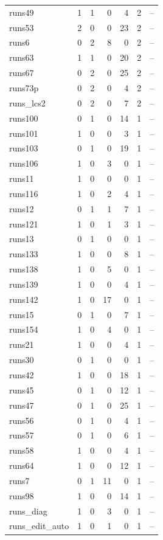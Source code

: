 \begin{longtable}{@{}lrrrrrr@{}}
runs49 & 1 & 1 & 0 & 4 & 2 & -- \\
runs53 & 2 & 0 & 0 & 23 & 2 & -- \\
runs6 & 0 & 2 & 8 & 0 & 2 & -- \\
runs63 & 1 & 1 & 0 & 20 & 2 & -- \\
runs67 & 0 & 2 & 0 & 25 & 2 & -- \\
runs73p & 0 & 2 & 0 & 4 & 2 & -- \\
runs\_lcs2 & 0 & 2 & 0 & 7 & 2 & -- \\
runs100 & 0 & 1 & 0 & 14 & 1 & -- \\
runs101 & 1 & 0 & 0 & 3 & 1 & -- \\
runs103 & 0 & 1 & 0 & 19 & 1 & -- \\
runs106 & 1 & 0 & 3 & 0 & 1 & -- \\
runs11 & 1 & 0 & 0 & 0 & 1 & -- \\
runs116 & 1 & 0 & 2 & 4 & 1 & -- \\
runs12 & 0 & 1 & 1 & 7 & 1 & -- \\
runs121 & 1 & 0 & 1 & 3 & 1 & -- \\
runs13 & 0 & 1 & 0 & 0 & 1 & -- \\
runs133 & 1 & 0 & 0 & 8 & 1 & -- \\
runs138 & 1 & 0 & 5 & 0 & 1 & -- \\
runs139 & 1 & 0 & 0 & 4 & 1 & -- \\
runs142 & 1 & 0 & 17 & 0 & 1 & -- \\
runs15 & 0 & 1 & 0 & 7 & 1 & -- \\
runs154 & 1 & 0 & 4 & 0 & 1 & -- \\
runs21 & 1 & 0 & 0 & 4 & 1 & -- \\
runs30 & 0 & 1 & 0 & 0 & 1 & -- \\
runs42 & 1 & 0 & 0 & 18 & 1 & -- \\
runs45 & 0 & 1 & 0 & 12 & 1 & -- \\
runs47 & 0 & 1 & 0 & 25 & 1 & -- \\
runs56 & 0 & 1 & 0 & 4 & 1 & -- \\
runs57 & 0 & 1 & 0 & 6 & 1 & -- \\
runs58 & 1 & 0 & 0 & 4 & 1 & -- \\
runs64 & 1 & 0 & 0 & 12 & 1 & -- \\
runs7 & 0 & 1 & 11 & 0 & 1 & -- \\
runs98 & 1 & 0 & 0 & 14 & 1 & -- \\
runs\_diag & 1 & 0 & 3 & 0 & 1 & -- \\
runs\_edit\_auto & 1 & 0 & 1 & 0 & 1 & -- \\

\end{longtable}
